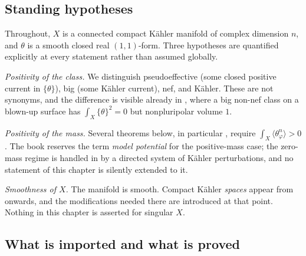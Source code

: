 \subsection{Standing hypotheses}
\label{sec:ch51-hypotheses}

Throughout, \(X\) is a connected compact K\"ahler manifold of complex
dimension \(n\), and \(\theta\) is a smooth closed real \((1,1)\)-form.
Three hypotheses are quantified explicitly at every statement rather than
assumed globally.

\emph{Positivity of the class.}  We distinguish pseudoeffective (some
closed positive current in \(\{\theta\}\)), big (some K\"ahler current),
nef, and K\"ahler.  These are not synonyms, and the difference is visible
already in , where a big non-nef class on a
blown-up surface has \(\int_X\{\theta\}^2=0\) but nonpluripolar volume
\(1\).

\emph{Positivity of the mass.}  Several theorems below, in particular
, require
\(\int_X\langle\theta_\varphi^n\rangle>0\).  The book reserves the term
\emph{model potential} for the positive-mass case; the zero-mass regime is
handled in  by a directed system of
K\"ahler perturbations, and no statement of this chapter is silently
extended to it.

\emph{Smoothness of \(X\).}  The manifold is smooth.  Compact K\"ahler
\emph{spaces} appear from  onwards, and
the modifications needed there are introduced at that point.  Nothing in
this chapter is asserted for singular \(X\).

\subsection{What is imported and what is proved}
\label{sec:ch51-imported}

